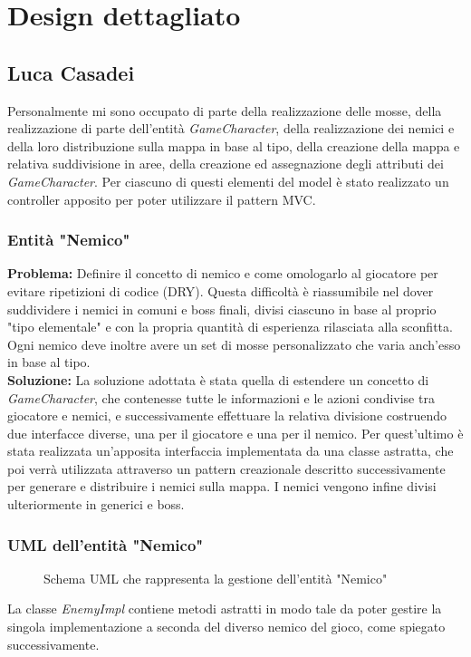 \documentclass[a4paper,12pt]{report}
\begin{document}
\section{Design dettagliato}
\subsection*{Luca Casadei}
Personalmente mi sono occupato di parte della realizzazione delle mosse, della realizzazione di parte dell'entità \textit{GameCharacter}, della realizzazione dei nemici e della loro distribuzione sulla mappa in base al tipo, della creazione della mappa e relativa suddivisione in aree, della creazione ed assegnazione degli attributi dei \textit{GameCharacter}. Per ciascuno di questi elementi del model è stato realizzato un controller apposito per poter utilizzare il pattern MVC.
\subsubsection{Entità "Nemico"}
\textbf{Problema:} Definire il concetto di nemico e come omologarlo al giocatore per evitare ripetizioni di codice (DRY).
Questa difficoltà è riassumibile nel dover suddividere i nemici in comuni e boss finali, divisi ciascuno in base al proprio "tipo elementale" e con la propria quantità di esperienza rilasciata alla sconfitta. Ogni nemico deve inoltre avere un set di mosse personalizzato che varia anch'esso in base al tipo.\\
\textbf{Soluzione:} La soluzione adottata è stata quella di estendere un concetto di \textit{GameCharacter}, che contenesse tutte le informazioni e le azioni condivise tra giocatore e nemici, e successivamente effettuare la relativa divisione costruendo due interfacce diverse, una per il giocatore e una per il nemico. Per quest'ultimo è stata realizzata un'apposita interfaccia implementata da una classe astratta, che poi verrà utilizzata attraverso un pattern creazionale descritto successivamente per generare e distribuire i nemici sulla mappa. I nemici vengono infine divisi ulteriormente in generici e boss.
\subsubsection{UML dell'entità "Nemico"}
\begin{figure}[H]
	\centering
	
	\caption{Schema UML che rappresenta la gestione dell'entità "Nemico"} 
	\label{fig:Schema UML dell'entità nemico}
\end{figure}
La classe \textit{EnemyImpl} contiene metodi astratti in modo tale da poter gestire la singola implementazione a seconda del diverso nemico del gioco, come spiegato successivamente.
\end{document}
